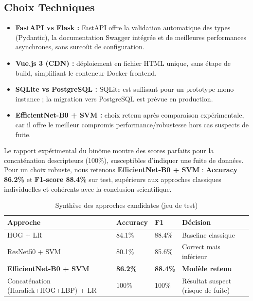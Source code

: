 \documentclass[12pt, a4paper]{report}
\begin{document}
\subsection{Choix Techniques}

\begin{itemize}
  \item \textbf{FastAPI vs Flask :} FastAPI offre la validation automatique
        des types (Pydantic), la documentation Swagger intégrée et de meilleures
        performances asynchrones, sans surcoût de configuration.
  \item \textbf{Vue.js 3 (CDN) :} déploiement en fichier HTML unique, sans
        étape de build, simplifiant le conteneur Docker frontend.
  \item \textbf{SQLite vs PostgreSQL :} SQLite est suffisant pour un prototype
        mono-instance ; la migration vers PostgreSQL est prévue en production.
  \item \textbf{EfficientNet-B0 + SVM :} choix retenu après comparaison expérimentale,
        car il offre le meilleur compromis performance/robustesse hors cas suspects de fuite.
\end{itemize}

\begin{infobox}
Le rapport expérimental du binôme montre des scores parfaits pour la concaténation
descripteurs (100\%), susceptibles d'indiquer une fuite de données.
Pour un choix robuste, nous retenons \textbf{EfficientNet-B0 + SVM} :
\textbf{Accuracy 86.2\%} et \textbf{F1-score 88.4\%} sur test, supérieurs aux
approches classiques individuelles et cohérents avec la conclusion scientifique.
\end{infobox}

\begin{table}[H]
\centering
\caption{Synthèse des approches candidates (jeu de test)}
\begin{tabularx}{\textwidth}{L{5.5cm} C{2cm} C{2cm} X}
\toprule
\textbf{Approche} & \textbf{Accuracy} & \textbf{F1} & \textbf{Décision} \\
\midrule
HOG + LR & 84.1\% & 88.4\% & Baseline classique \\
ResNet50 + SVM & 80.1\% & 85.6\% & Correct mais inférieur \\
\textbf{EfficientNet-B0 + SVM} & \textbf{86.2\%} & \textbf{88.4\%} & \textbf{Modèle retenu} \\
Concaténation (Haralick+HOG+LBP) + LR & 100\% & 100\% & Résultat suspect (risque de fuite) \\
\bottomrule
\end{tabularx}
\end{table}
\newpage
\end{document}
